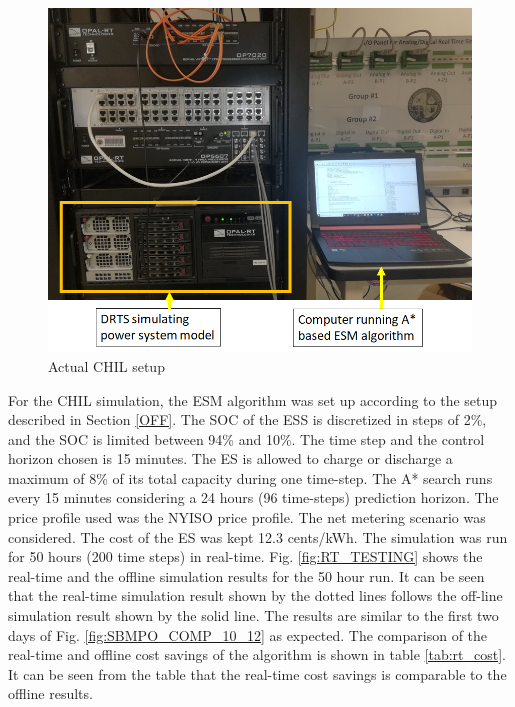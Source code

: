 \begin{figure}[!ht]
    \centering
    \includegraphics[width = \linewidth]{figs/LAB_REAL.png}
    \caption{Actual CHIL setup}
    \label{fig:LAB_REAL}
\end{figure}

For the CHIL simulation, the ESM algorithm was set up according to the setup described in Section \ref{OFF}. The  SOC of the ESS is discretized in steps of 2\%, and the SOC is limited between  94\%  and  10\%. The time step and the control horizon chosen is 15 minutes. The ES is allowed to charge or discharge a maximum of 8\% of its total capacity during one time-step. The A* search runs every 15 minutes considering a 24 hours (96 time-steps) prediction horizon. The price profile used was the NYISO price profile. The net metering scenario was considered. The cost of the ES was kept 12.3 cents/kWh. The simulation was run for 50 hours (200 time steps) in real-time. Fig. \ref{fig:RT_TESTING} shows the real-time and the offline simulation results for the 50 hour run. It can be seen that the real-time simulation result shown by the dotted lines follows the off-line simulation result shown by the solid line. The results are similar to the first two days of Fig. \ref{fig:SBMPO_COMP_10_12} as expected. The comparison of the real-time and offline cost savings of the algorithm is shown in table \ref{tab:rt_cost}. It can be seen from the table that the real-time cost savings is comparable to the offline results.




